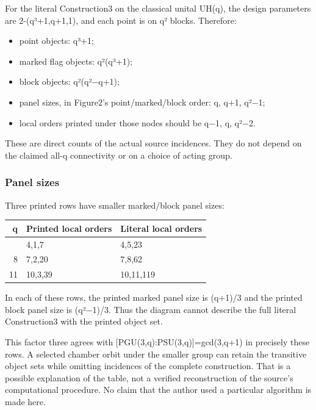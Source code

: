 For the literal Construction3 on the classical unital UH(q), the design
parameters are 2-(q³+1,q+1,1), and each point is on q² blocks.
Therefore:

\begin{itemize}
\tightlist
\item
  point objects: q³+1;
\item
  marked flag objects: q²(q³+1);
\item
  block objects: q²(q²−q+1);
\item
  panel sizes, in Figure2's point/marked/block order: q, q+1, q²−1;
\item
  local orders printed under those nodes should be q−1, q, q²−2.
\end{itemize}

These are direct counts of the actual source incidences. They do not
depend on the claimed all-q connectivity or on a choice of acting group.

\subsubsection{Panel sizes}\label{panel-sizes}

Three printed rows have smaller marked/block panel sizes:

{\def\LTcaptype{none} %
\begin{longtable}[]{@{}rll@{}}
\toprule\noalign{}
q & Printed local orders & Literal local orders \\
\midrule\noalign{}
\endhead
\bottomrule\noalign{}
\endlastfoot
5 & 4,1,7 & 4,5,23 \\
8 & 7,2,20 & 7,8,62 \\
11 & 10,3,39 & 10,11,119 \\
\end{longtable}
}

In each of these rows, the printed marked panel size is (q+1)/3 and the
printed block panel size is (q²−1)/3. Thus the diagram cannot describe
the full literal Construction3 with the printed object set.

This factor three agrees with {[}PGU(3,q):PSU(3,q){]}=gcd(3,q+1) in
precisely these rows. A selected chamber orbit under the smaller group
can retain the transitive object sets while omitting incidences of the
complete construction. That is a possible explanation of the table, not
a verified reconstruction of the source's computational procedure. No
claim that the author used a particular algorithm is made here.

